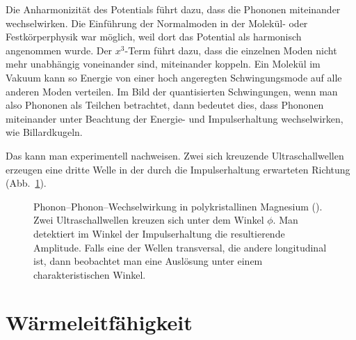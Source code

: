 Die Anharmonizität des Potentials führt dazu, dass die Phononen miteinander wechselwirken. Die Einführung der Normalmoden in der Molekül- oder Festkörperphysik war möglich, weil dort das Potential als harmonisch angenommen wurde. Der $x^3$-Term führt dazu, dass die einzelnen Moden nicht mehr unabhängig voneinander sind, miteinander koppeln. Ein Molekül im Vakuum kann so Energie von einer hoch angeregten Schwingungsmode auf alle anderen Moden verteilen. Im Bild der quantisierten Schwingungen, wenn man also Phononen als Teilchen betrachtet, dann bedeutet dies, dass Phononen miteinander unter Beachtung der Energie- und Impulserhaltung wechselwirken, wie Billardkugeln.

Das kann man experimentell nachweisen. Zwei sich kreuzende Ultraschallwellen erzeugen eine dritte Welle in der durch die Impulserhaltung erwarteten Richtung (Abb.~\ref{fig:1_US_interaction}).

\begin{figure} 
    
    \caption{Phonon--Phonon--Wechselwirkung in polykristallinen Magnesium (\cite{RollinsJr1964}). Zwei Ultraschallwellen kreuzen sich unter dem Winkel $\phi$. Man detektiert im Winkel der Impulserhaltung die resultierende Amplitude. Falls eine der Wellen transversal, die andere longitudinal ist, dann beobachtet man eine Auslösung unter einem charakteristischen Winkel. }
    \label{fig:1_US_interaction}
\end{figure}

\section*{Wärmeleitfähigkeit}

